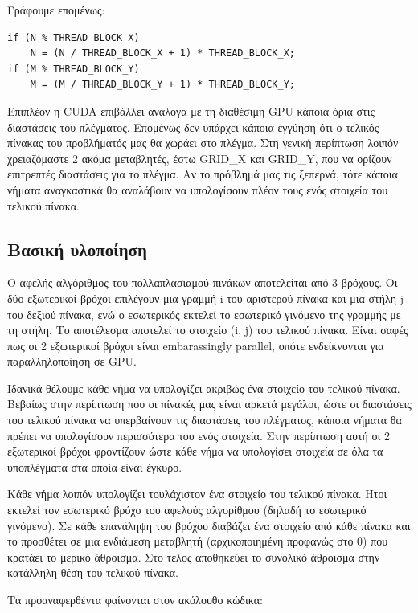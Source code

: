\documentclass[titlepage]{article}
\begin{document}
Γράφουμε επομένως:

\begin{verbatim}
if (N % THREAD_BLOCK_X)
    N = (N / THREAD_BLOCK_X + 1) * THREAD_BLOCK_X;
if (M % THREAD_BLOCK_Y)
    M = (M / THREAD_BLOCK_Y + 1) * THREAD_BLOCK_Y;
\end{verbatim}

Επιπλέον η CUDA επιβάλλει ανάλογα με τη διαθέσιμη GPU κάποια όρια στις διαστάσεις του πλέγματος. Επομένως δεν υπάρχει κάποια εγγύηση ότι ο τελικός πίνακας του προβλήματός μας θα χωράει στο πλέγμα. Στη γενική περίπτωση λοιπόν χρειαζόμαστε 2 ακόμα μεταβλητές, έστω GRID\_X και GRID\_Y, που να ορίζουν επιτρεπτές διαστάσεις για το πλέγμα. Αν το πρόβλημά μας τις ξεπερνά, τότε κάποια νήματα αναγκαστικά θα αναλάβουν να υπολογίσουν πλέον τους ενός στοιχεία του τελικού πίνακα.

\subsection{Βασική υλοποίηση}

Ο αφελής αλγόριθμος του πολλαπλασιαμού πινάκων αποτελείται από 3 βρόχους. Οι δύο εξωτερικοί βρόχοι επιλέγουν μια γραμμή i του αριστερού πίνακα και μια στήλη j του δεξιού πίνακα, ενώ ο εσωτερικός εκτελεί το εσωτερικό γινόμενο της γραμμής με τη στήλη. Το αποτέλεσμα αποτελεί το στοιχείο (i, j) του τελικού πίνακα. Είναι σαφές πως οι 2 εξωτερικοί βρόχοι είναι embarassingly parallel, οπότε ενδείκνυνται για παραλληλοποίηση σε GPU.

Ιδανικά θέλουμε κάθε νήμα να υπολογίζει ακριβώς ένα στοιχείο του τελικού πίνακα. Βεβαίως στην περίπτωση που οι πίνακές μας είναι αρκετά μεγάλοι, ώστε οι διαστάσεις του τελικού πίνακα να υπερβαίνουν τις διαστάσεις του πλέγματος, κάποια νήματα θα πρέπει να υπολογίσουν περισσότερα του ενός στοιχεία. Στην περίπτωση αυτή οι 2 εξωτερικοί βρόχοι φροντίζουν ώστε κάθε νήμα να υπολογίσει στοιχεία σε όλα τα υποπλέγματα στα οποία είναι έγκυρο.

Κάθε νήμα λοιπόν υπολογίζει τουλάχιστον ένα στοιχείο του τελικού πίνακα. Ήτοι εκτελεί τον εσωτερικό βρόχο του αφελούς αλγορίθμου (δηλαδή το εσωτερικό γινόμενο). Σε κάθε επανάληψη του βρόχου διαβάζει ένα στοιχείο από κάθε πίνακα και το προσθέτει σε μια ενδιάμεση μεταβλητή (αρχικοποιημένη προφανώς στο 0) που κρατάει το μερικό άθροισμα. Στο τέλος αποθηκεύει το συνολικό άθροισμα στην κατάλληλη θέση του τελικού πίνακα.

Τα προαναφερθέντα φαίνονται στον ακόλουθο κώδικα:
\end{document}
